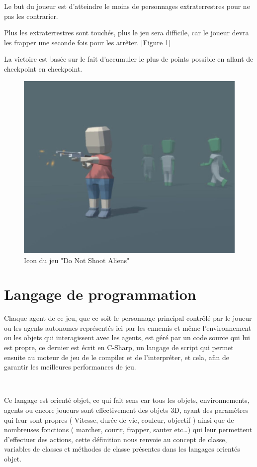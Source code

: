 Le but du joueur est d’atteindre le moins de personnages extraterrestres pour ne pas les contrarier.

Plus les extraterrestres sont touchés, plus le jeu sera difficile, car le joueur devra les frapper une seconde fois pour les arrêter. [Figure \ref{fig:7.2}] 

La victoire est basée sur le fait d’accumuler le plus de points possible en allant de checkpoint en checkpoint.

\begin{figure}[th]
\centering
\includegraphics{Figures/72unity.JPG}
\decoRule
\caption[Icon du jeu "Do Not Shoot Aliens"]{Icon du jeu "Do Not Shoot Aliens"}
\label{fig:7.2}
\end{figure}

\section{Langage de programmation}

Chaque agent de ce jeu, que ce soit le personnage principal contrôlé par le joueur ou les agents autonomes représentés ici par les ennemis et même l’environnement ou les objets qui interagissent avec les agents, est géré par un code source qui lui est propre, ce dernier est écrit en C-Sharp, un langage de script qui permet ensuite au moteur de jeu de le compiler et de l'interpréter, et cela, afin de garantir les meilleures performances de jeu.

~\par
Ce langage est orienté objet, ce qui fait sens car tous les objets, environnements, agents ou encore joueurs sont effectivement des objets 3D, ayant des paramètres qui leur sont propres ( Vitesse, durée de vie, couleur, objectif ) ainsi que de nombreuses fonctions ( marcher, courir, frapper, sauter etc…) qui leur permettent d’effectuer des actions, cette définition nous renvoie au concept de classe, variables de classes et méthodes de classe présentes dans les langages orientés objet.


